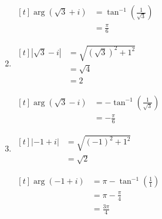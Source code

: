 \documentclass[11pt,a4paper]{book}
\begin{document}
\begin{example}
\begin{enumerate}[label=(\alph*)]
\begin{minipage}[t]{0.3\textwidth}
\end{minipage}
\begin{minipage}[t]{0.3\textwidth}

$
\begin{aligned}[t]
\arg\left(\sqrt{3}+i\right) & =\tan^{-1}\left(\frac{1}{\sqrt{3}}\right)\\
 & =\frac{\pi}{6}
\end{aligned}
$

\end{minipage}

\item

\begin{minipage}[t]{0.3\textwidth}
$
\begin{aligned}[t]
\left|\sqrt{3}-i\right| & =\sqrt{\left(\sqrt{3}\right)^{2}+1^{2}}\\
 & =\sqrt{4}\\
 & =2
\end{aligned}
$

\end{minipage}
\begin{minipage}[t]{0.3\textwidth}

$
\begin{aligned}[t]
\arg\left(\sqrt{3}-i\right) & =-\tan^{-1}\left(\frac{1}{\sqrt{3}}\right)\\
 & =-\frac{\pi}{6}
\end{aligned}
$

\end{minipage}

\item

\begin{minipage}[t]{0.3\textwidth}

$
\begin{aligned}[t]
\left|-1+i\right| & =\sqrt{\left(-1\right)^{2}+1^{2}}\\
 & =\sqrt{2}
\end{aligned}
$

\end{minipage}
\begin{minipage}[t]{0.3\textwidth}

$
\begin{aligned}[t]
\arg\left(-1+i\right) & =\pi-\tan^{-1}\left(\frac{1}{1}\right)\\
 & =\pi-\frac{\pi}{4}\\
 & =\frac{3\pi}{4}
\end{aligned}
$

\end{minipage}


\end{enumerate}
\end{example}
\end{document}
